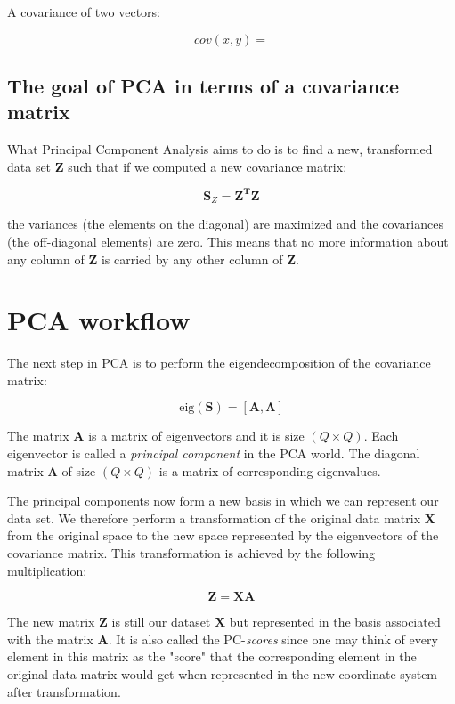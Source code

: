 \documentclass[10pt,twocolumn]{article}
\begin{document}
A covariance of two vectors:

\begin{equation}
cov(x, y) = 
\end{equation}


\subsection{The goal of PCA in terms of a covariance matrix}

What Principal Component Analysis aims to do is to find a new, transformed data set $\bm{Z}$ such that if we computed a new covariance matrix:

\begin{equation}
\bm{S}_Z =  \bm{Z^T} \bm{Z}
\end{equation}



the variances (the elements on the diagonal) are maximized and the covariances (the off-diagonal elements) are zero. This means that no more information about any column of $\bm{Z}$ is carried by any other column of $\bm{Z}$.


\section{PCA workflow}

The next step in PCA is to perform the eigendecomposition of the covariance matrix:

\begin{equation} \label{eq:eig-dec}
\text{eig}(\bm{S}) = [\bm{A}, \bm{\Lambda}]
\end{equation}

The matrix $\bm{A}$ is a matrix of eigenvectors and it is size $(Q \times Q)$. Each eigenvector is called a \textit{principal component} in the PCA world. The diagonal matrix $\bm{\Lambda}$ of size $(Q \times Q)$ is a matrix of corresponding eigenvalues.

The principal components now form a new basis in which we can represent our data set. We therefore perform a transformation of the original data matrix $\bm{X}$ from the original space to the new space represented by the eigenvectors of the covariance matrix. This transformation is achieved by the following multiplication:

\begin{equation}
\bm{Z} = \bm{X} \bm{A}
\end{equation}

The new matrix $\bm{Z}$ is still our dataset $\bm{X}$ but represented in the basis associated with the matrix $\bm{A}$. It is also called the PC-\textit{scores} since one may think of every element in this matrix as the "score" that the corresponding element in the original data matrix would get when represented in the new coordinate system after transformation.
\end{document}
